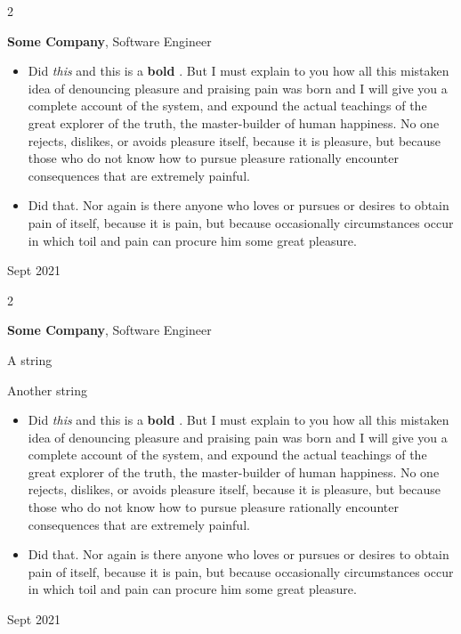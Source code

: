 \documentclass[10pt, letterpaper]{article}
\newenvironment{summary}{
    \begin{description}[
        topsep=0.10 cm,
        parsep=0.10 cm,
        partopsep=0pt,
        itemsep=0pt,
        leftmargin=0.4 cm + 10pt
    ]
}{
    \end{description}
} %
\newenvironment{highlights}{
    \begin{itemize}[
        topsep=0.10 cm,
        parsep=0.10 cm,
        partopsep=0pt,
        itemsep=0pt,
        leftmargin=0.4 cm + 10pt
    ]
}{
    \end{itemize}
} %
\newenvironment{twocolentry}[2][]{
    \onecolentry
    \def\secondColumn{#2}
    \setcolumnwidth{\fill, 4.5 cm}
    \begin{paracol}{2}
}{
    \switchcolumn \raggedleft \secondColumn
    \end{paracol}
    \endonecolentry
} %
\let\hrefWithoutArrow\href
\renewcommand{\href}[2]{\hrefWithoutArrow{#1}{\ifthenelse{\equal{#2}{}}{ }{#2 }\raisebox{.15ex}{\footnotesize \faExternalLink*}}}
\begin{document}
        \vspace{0.2 cm}

        \begin{twocolentry}{
            Sept 2021
        }
            \textbf{Some \textnormal{Company}}, Software Engineer
            \begin{highlights}
                \item Did \textit{this} and this is a \textbf{bold} \href{https://example.com}{link}. But I must explain to you how all this mistaken idea of denouncing pleasure and praising pain was born and I will give you a complete account of the system, and expound the actual teachings of the great explorer of the truth, the master-builder of human happiness. No one rejects, dislikes, or avoids pleasure itself, because it is pleasure, but because those who do not know how to pursue pleasure rationally encounter consequences that are extremely painful.
                \item Did that. Nor again is there anyone who loves or pursues or desires to obtain pain of itself, because it is pain, but because occasionally circumstances occur in which toil and pain can procure him some great pleasure.
            \end{highlights}
        \end{twocolentry}


        \vspace{0.2 cm}

        \begin{twocolentry}{
            Sept 2021
        }
            \textbf{Some \textnormal{Company}}, Software Engineer
            \begin{summary}
                \item A string
                \item Another string
            \end{summary}
            \begin{highlights}
                \item Did \textit{this} and this is a \textbf{bold} \href{https://example.com}{link}. But I must explain to you how all this mistaken idea of denouncing pleasure and praising pain was born and I will give you a complete account of the system, and expound the actual teachings of the great explorer of the truth, the master-builder of human happiness. No one rejects, dislikes, or avoids pleasure itself, because it is pleasure, but because those who do not know how to pursue pleasure rationally encounter consequences that are extremely painful.
                \item Did that. Nor again is there anyone who loves or pursues or desires to obtain pain of itself, because it is pain, but because occasionally circumstances occur in which toil and pain can procure him some great pleasure.
            \end{highlights}
        \end{twocolentry}
\end{document}
